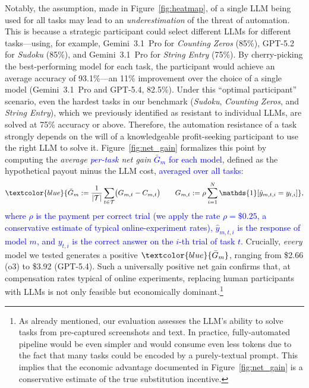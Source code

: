 \documentclass[12pt,a4paper]{article}
\newcommand{\blue}[1]{\textcolor{blue}{#1}}
\begin{document}
Notably, the assumption, made in Figure~\ref{fig:heatmap}, of a single LLM being used for all tasks may lead to an {\em underestimation} of the threat of automation. This is because a strategic participant could select different LLMs for different tasks---using, for example, Gemini~3.1~Pro for \emph{Counting Zeros} (85\%), GPT-5.2 for \emph{Sudoku} (85\%), and Gemini~3.1~Pro for \emph{String Entry} (75\%). By cherry-picking the best-performing model for each task, the participant would achieve an average accuracy of 93.1\%---an 11\% improvement over the choice of a single model (Gemini~3.1~Pro and GPT-5.4, 82.5\%).
Under this ``optimal participant'' scenario, even the hardest tasks in our benchmark (\emph{Sudoku}, \emph{Counting Zeros}, and \emph{String Entry}), which
we previously
identified as resistant to individual LLMs, are solved at 75\% accuracy or above. Therefore, the automation resistance of a task strongly depends on the will of a knowledgeable profit-seeking participant to use the right LLM to solve it. Figure~\ref{fig:net_gain} formalizes this point by computing the \emph{average \blue{per-task} net gain} \blue{$\bar{G}_m$ for each model}, defined as the hypothetical payout minus the LLM cost, \blue{averaged over all tasks}:
$$
\blue{\bar{G}_{m} := \frac{1}{|\mathcal{T}|}\sum_{t \in \mathcal{T}} \bigl(G_{m,t} - C_{m,t}\bigr) \qquad G_{m,t} := \rho \sum_{i=1}^N \mathds{1}[\hat{y}_{m,t,i}=y_{t,i}]},
$$
\blue{where $\rho$ is the payment per correct trial (we apply the rate $\rho = \$0.25$, a conservative estimate of typical online-experiment rates), $\hat{y}_{m,t,i}$ is the response of model $m$, and $y_{t,i}$ is the correct answer on the $i$-th trial of task $t$.} 
Crucially, {\em every} model we tested generates a positive $\blue{\bar{G}_m}$, ranging from \$2.66 (o3) to \$3.92 (GPT-5.4). Such a universally positive net gain confirms that, at compensation rates typical of online experiments, replacing human participants with LLMs is not only feasible but economically dominant.\footnote{As already mentioned, our evaluation assesses the LLM's ability to solve tasks from pre-captured screenshots and text. In practice, fully-automated pipeline would be even simpler and would consume even less tokens due to the fact that many tasks could be encoded by a purely-textual prompt. This implies that the economic advantage documented in Figure~\ref{fig:net_gain} is a conservative estimate of the true substitution incentive.}

\end{document}
